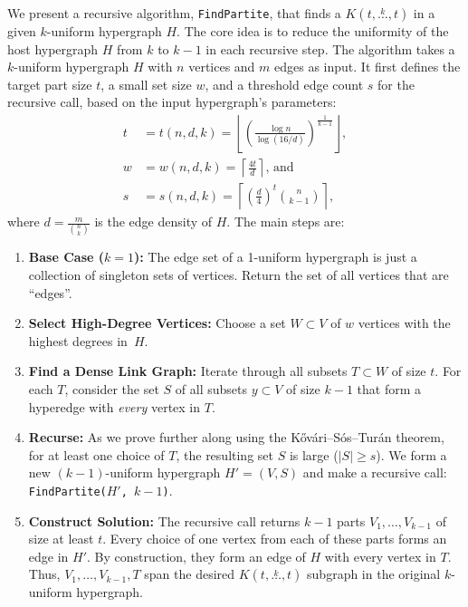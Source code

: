 \documentclass{amsart}
\newcommand{\compoverset}[2]{\ensuremath{K(#2, \overset{#1}{\dots}, #2)}}
\begin{document}
We present a recursive algorithm, \texttt{FindPartite}, that finds a $\compoverset{k}{t}$ in a given $k$-uniform hypergraph $H$.
The core idea is to reduce the uniformity of the host hypergraph $H$ from $k$ to $k-1$ in each recursive step.
The algorithm takes a $k$-uniform hypergraph $H$ with $n$ vertices and $m$ edges as input.
It first defines the target part size $t$, a small set size $w$,
and a threshold edge count $s$ for the recursive call, based on the input hypergraph's parameters:
\begin{align*}
    t &= t(n, d, k) = \left\lfloor \left( \frac{\log n}{\log (16/d)}\right)^{\frac{1}{k-1}}\right\rfloor, \\
    w &= w(n, d, k) = \left\lceil \frac{4 t}{d}\right\rceil \text{, and } \\
    s &= s(n, d, k) = \left\lceil \left( \frac{d}{4}\right)^t \binom{n}{k-1}\right\rceil,
\end{align*}
where $d = \frac{m}{\binom{n}{k}}$ is the edge density of $H$.
The main steps are:
\begin{enumerate}
    \item \textbf{Base Case ($k=1$):} The edge set of a 1-uniform hypergraph is just a collection of singleton sets of vertices.
    Return the set of all vertices that are ``edges''.

    \item \textbf{Select High-Degree Vertices:} Choose a set $W \subset V$ of $w$ vertices with the highest degrees in~$H$. \label{W}

    \item \textbf{Find a Dense Link Graph:} Iterate through all subsets $T \subset W$ of size $t$.
    For each $T$, consider the set $S$ of all subsets $y \subset V$ of size $k-1$ that form a hyperedge with \emph{every} vertex in $T$. \label{link}

    \item \textbf{Recurse:} As we prove further along using the K\H{o}v\'{a}ri–S\'{o}s–Tur\'{a}n theorem, for at least one choice of $T$,
    the resulting set $S$ is large ($|S| \ge s$). We form a new $(k-1)$-uniform hypergraph $H'=(V, S)$ and make a recursive call: \texttt{FindPartite($H'$, $k-1$)}.

    \item \textbf{Construct Solution:} The recursive call returns $k-1$ parts $V_1, \dots, V_{k-1}$ of size at least $t$.
    Every choice of one vertex from each of these parts forms an edge in $H'$.
    By construction, they form an edge of $H$ with every vertex in $T$.
    Thus, $V_1, \dots, V_{k-1}, T$ span the desired $\compoverset{k}{t}$ subgraph in the original $k$-uniform hypergraph.

\end{enumerate}
\end{document}
